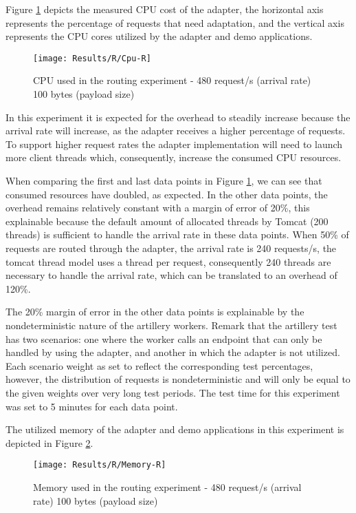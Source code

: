 Figure \ref{fig:routCpu} depicts the measured CPU cost of the adapter, the horizontal axis represents the percentage of requests that need adaptation, and the vertical axis represents the
CPU cores utilized by the adapter and demo applications.

\begin{figure}[htbp]
    \centering
    \centerline{\texttt{[image: Results/R/Cpu-R]}}
    \caption{CPU used in the routing experiment - 480 request/s (arrival rate) 100 bytes (payload size)}
    \label{fig:routCpu}
\end{figure}

In this experiment it is expected for the overhead to steadily increase because the arrival rate will increase, as the adapter receives a higher percentage of requests. To support higher request rates
the adapter implementation will need to launch more client threads which, consequently, increase the consumed CPU resources.

When comparing the first and last data points in Figure \ref{fig:routCpu}, we can see that consumed resources have doubled, as expected.
In the other data points, the overhead remains relatively constant with a margin of error of 20\%,
this explainable because the default amount of allocated threads by Tomcat (200 threads) is sufficient to handle the arrival rate in these data points.
When 50\% of requests are routed through the adapter, the arrival rate is 240 requests/s, the tomcat thread model uses a thread per request,
consequently 240 threads are necessary to handle the arrival rate, which can be translated to an overhead of 120\%.

The 20\% margin of error in the other data points is explainable by the nondeterministic nature of the artillery workers.
Remark that the artillery test has two scenarios: one where the worker calls an endpoint that can only be handled by using the adapter, and another in which the adapter is not utilized.
Each scenario weight as set to reflect the corresponding test percentages,
however, the distribution of requests is nondeterministic and will only be equal to the given weights over very long test periods.
The test time for this experiment was set to 5 minutes for each data point.

The utilized memory of the adapter and demo applications in this experiment is depicted in Figure \ref{fig:routMem}.

\begin{figure}[htbp]
    \centering
    \centerline{\texttt{[image: Results/R/Memory-R]}}
    \caption{Memory used in the routing experiment - 480 request/s (arrival rate) 100 bytes (payload size)}
    \label{fig:routMem}
\end{figure}

